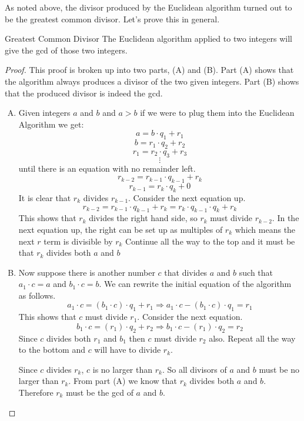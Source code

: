 As noted above,  the divisor produced by the Euclidean algorithm turned out to be the greatest common divisor. Let's prove this in general.

\begin{prop}{Greatest Common Divisor}
The Euclidean algorithm applied to two integers will give the gcd of those two integers.
\end{prop}
\begin{proof}
This proof is broken up into two parts, (A) and (B).  Part (A) shows that the algorithm always produces a divisor of the two given integers.  Part (B) shows that the produced divisor is indeed the gcd.

\begin{enumerate}[(A)]
\item
Given integers $a$ and $b$ and $a>b$ if we were to plug them into the Euclidean Algorithm we get:
\[a = b\cdot q_1 + r_1\]
\[b = r_1\cdot q_2 + r_2\]
\[r_1 = r_2\cdot q_3 + r_3\]
\[\vdots\]
until there is an equation with no remainder left.
\[r_{k-2} = r_{k-1}\cdot q_{k-1} + r_k\]
\[r_{k-1} = r_k\cdot q_k + 0\]
It is clear that $r_k$ divides $r_{k-1}$. Consider the next equation up.  
\[r_{k-2} = r_{k-1}\cdot q_{k-1} + r_k = r_{k}\cdot q_{k-1} \cdot q_{k} + r_k\]
This shows that $r_{k} $ divides the right hand side, so $r_{k}$ must divide $r_{k-2}$.
In the next equation up, the right can be set up as multiples of $r_{k}$ which means the next $r$ term is divisible by $r_k$
Continue all the way to the top and it must be that $r_k$ divides both $a$ and $b$
\item
Now suppose there is another number $c$ that divides $a$ and $b$ such that $a_1 \cdot c = a$ and $b_1 \cdot c = b$.  We can rewrite the initial equation of the algorithm as follows.
\[a_1\cdot c = (b_1 \cdot c)\cdot q_1 + r_1 \Rightarrow a_1\cdot c - (b_1 \cdot c)\cdot q_1 = r_1\]
This shows that $c$ must divide $r_1$.  Consider the next equation.
\[b_1\cdot c = (r_1)\cdot q_2 + r_2 \Rightarrow b_1\cdot c - (r_1)\cdot q_2 = r_2\]
Since $c$ divides both $r_1$ and $b_1$ then $c$ must divide $r_2$ also.
Repeat all the way to the bottom and $c$ will have to divide $r_k$.

Since $c$ divides $r_k$, $c$ is no larger than $r_k$.  So all divisors of $a$ and $b$ must be no larger than $r_k$.  From part (A) we know that $r_k$ divides both $a$ and $b$. Therefore $r_k$ must be the gcd of $a$ and $b$.
\end {enumerate}
\end {proof}

